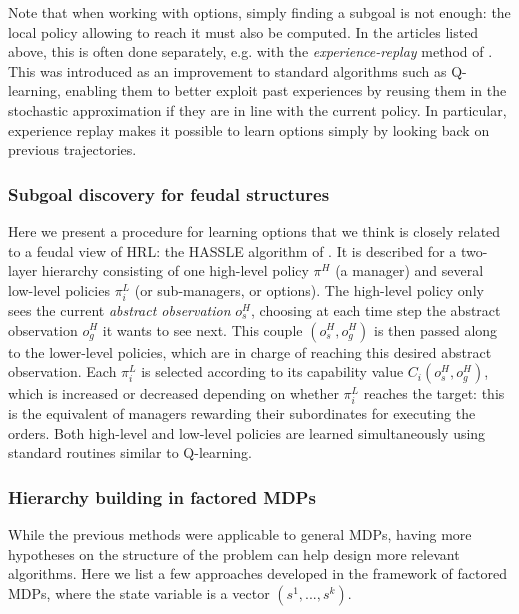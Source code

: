 \documentclass{article}
\begin{document}
Note that when working with options, simply finding a subgoal is not enough: the local policy allowing to reach it must also be computed. In the articles listed above, this is often done separately, e.g. with the \textit{experience-replay} method of \cite{lin_self-improving_1992}. This was introduced as an improvement to standard algorithms such as Q-learning, enabling them to better exploit past experiences by reusing them in the stochastic approximation if they are in line with the current policy. In particular, experience replay makes it possible to learn options simply by looking back on previous trajectories.

\subsubsection{Subgoal discovery for feudal structures}

Here we present a procedure for learning options that we think is closely related to a feudal view of HRL: the HASSLE algorithm of \cite{bakker_hierarchical_2004}. It is described for a two-layer hierarchy consisting of one high-level policy $\pi^H$ (a manager) and several low-level policies $\pi_i^L$ (or sub-managers, or options). The high-level policy only sees the current \textit{abstract observation} $o_s^H$, choosing at each time step the abstract observation $o_g^H$ it wants to see next. This couple $(o_s^H, o_g^H)$ is then passed along to the lower-level policies, which are in charge of reaching this desired abstract observation. Each $\pi_i^L$ is selected according to its capability value $C_i(o_s^H, o_g^H)$, which is increased or decreased depending on whether $\pi_i^L$ reaches the target: this is the equivalent of managers rewarding their subordinates for executing the orders. Both high-level and low-level policies are learned simultaneously using standard routines similar to Q-learning.

\subsubsection{Hierarchy building in factored MDPs}

While the previous methods were applicable to general MDPs, having more hypotheses on the structure of the problem can help design more relevant algorithms. Here we list a few approaches developed in the framework of factored MDPs, where the state variable is a vector $(s^1, ..., s^k)$.
\end{document}
